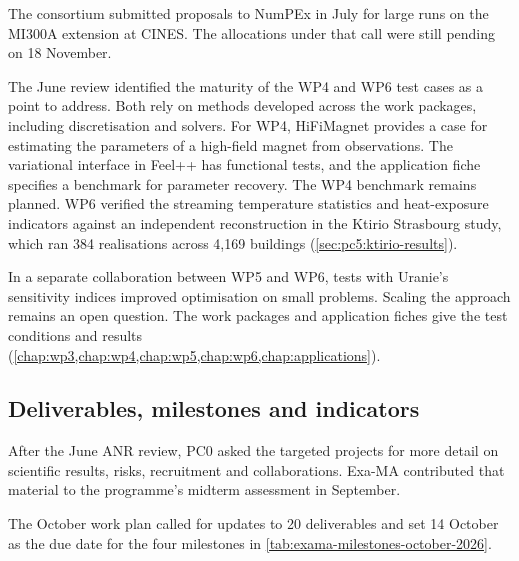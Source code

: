The consortium submitted proposals to NumPEx in July for large runs on
the MI300A extension at CINES. The allocations under that call were
still pending on 18 November.

The June review identified the maturity of the WP4 and WP6 test cases
as a point to address. Both rely on methods developed across the
work packages, including discretisation and solvers. For WP4,
HiFiMagnet provides a case for estimating the parameters of a high-field
magnet from observations. The variational interface in Feel++ has
functional tests, and the application fiche specifies a benchmark for
parameter recovery. The WP4 benchmark remains planned. WP6 verified
the streaming temperature statistics and heat-exposure indicators
against an independent reconstruction in the Ktirio Strasbourg study,
which ran 384 realisations across 4,169 buildings%
\ifdefined\ExaMAStandaloneManagement\else\space(\cref{sec:pc5:ktirio-results})\fi.

In a separate collaboration between WP5 and WP6, tests with
Uranie's sensitivity indices improved optimisation on small problems.
Scaling the approach remains an open question.
\ifdefined\ExaMAStandaloneManagement\else
The work packages and application fiches give the test conditions and
results (\cref{chap:wp3,chap:wp4,chap:wp5,chap:wp6,chap:applications}).
\fi

\subsection{Deliverables, milestones and indicators}
\label{sec:management-milestones-2026}

After the June ANR review, PC0 asked the targeted projects for more detail
on scientific results, risks, recruitment and collaborations.
Exa-MA contributed that material to the programme's midterm assessment
in September.

The October work plan called for updates to 20 deliverables and set
14 October as the due date for the four milestones in
\cref{tab:exama-milestones-october-2026}.

